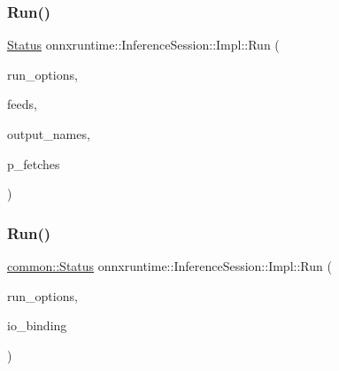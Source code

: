 \subsubsection{\texorpdfstring{Run()}{Run()}\hspace{0.1cm}{\footnotesize\ttfamily [2/4]}}
{\footnotesize\ttfamily \mbox{\hyperlink{classonnxruntime_1_1common_1_1Status}{Status}} onnxruntime\+::\+Inference\+Session\+::\+Impl\+::\+Run (\begin{DoxyParamCaption}\item[{const \mbox{\hyperlink{namespaceonnxruntime_a28ccb3d97f6827bf04d2ce259ff968f1}{Run\+Options}} \&}]{run\+\_\+options,  }\item[{const \mbox{\hyperlink{namespaceonnxruntime_a48b01f0410ec8d693dbd40d1132bd66c}{Name\+M\+L\+Val\+Map}} \&}]{feeds,  }\item[{const std\+::vector$<$ std\+::string $>$ \&}]{output\+\_\+names,  }\item[{std\+::vector$<$ \mbox{\hyperlink{classonnxruntime_1_1MLValue}{M\+L\+Value}} $>$ $\ast$}]{p\+\_\+fetches }\end{DoxyParamCaption})\hspace{0.3cm}{\ttfamily [inline]}}

\mbox{\label{classonnxruntime_1_1InferenceSession_1_1Impl_a8c0b0a42c5f4ba3a4fa6cffb730bb5f6}} 
\subsubsection{\texorpdfstring{Run()}{Run()}\hspace{0.1cm}{\footnotesize\ttfamily [3/4]}}
{\footnotesize\ttfamily \mbox{\hyperlink{classonnxruntime_1_1common_1_1Status}{common\+::\+Status}} onnxruntime\+::\+Inference\+Session\+::\+Impl\+::\+Run (\begin{DoxyParamCaption}\item[{const \mbox{\hyperlink{namespaceonnxruntime_a28ccb3d97f6827bf04d2ce259ff968f1}{Run\+Options}} \&}]{run\+\_\+options,  }\item[{\mbox{\hyperlink{classonnxruntime_1_1IOBinding}{I\+O\+Binding}} \&}]{io\+\_\+binding }\end{DoxyParamCaption})\hspace{0.3cm}{\ttfamily [inline]}}

